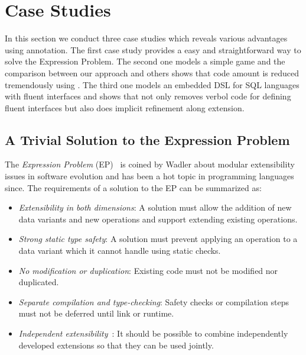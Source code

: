 \section{Case Studies}
In this section we conduct three case studies which reveals various advantages
using \mixin annotation. The first case study provides a easy and
straightforward way to solve the Expression Problem. The second one models a
simple game and the comparison between our approach and others shows that code
amount is reduced tremendously using \mixin. The third one models an embedded
DSL for SQL languages with fluent interfaces and shows that \mixin not only
removes verbol code for defining fluent interfaces but also does implicit
refinement along extension.

\subsection{A Trivial Solution to the Expression Problem}

The \emph{Expression Problem} (EP)~\cite{wadler98expression-problem} is coined
by Wadler about modular extensibility issues in software evolution and has been
a hot topic in programming languages since. The requirements of a solution to
the EP can be summarized as: 
\begin{itemize}
\item \emph{Extensibility in both dimensions}: A solution must allow
  the addition of new data variants and new operations and support
  extending existing operations.
\item \emph{Strong static type safety}: A solution must prevent
  applying an operation to a data variant which it cannot handle using
  static checks.
\item \emph{No modification or duplication}: Existing code must not be
  modified nor duplicated.
\item \emph{Separate compilation and type-checking}: Safety checks or
  compilation steps must not be deferred until link or runtime.
\item \emph{Independent extensibility}~\cite{zenger05independentlyextensible}:
  It should be possible to combine independently developed extensions so that
  they can be used jointly.
\end{itemize}

